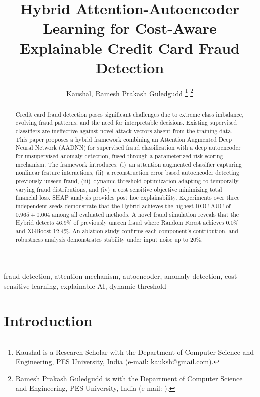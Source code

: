 \documentclass[conference]{IEEEtran}
\begin{document}
\title{Hybrid Attention-Autoencoder Learning for Cost-Aware Explainable Credit Card Fraud Detection}

\author{
Kaushal,
Ramesh Prakash Guledgudd
%
\thanks{Kaushal is a Research Scholar with the Department of Computer Science and Engineering, PES University, India (e-mail: kauksh@gmail.com).}
\thanks{Ramesh Prakash Guledgudd is with the Department of Computer Science and Engineering, PES University, India (e-mail: ).}
}

\maketitle

\begin{abstract}
Credit card fraud detection poses significant challenges due to extreme class imbalance, evolving fraud patterns, and the need for interpretable decisions. Existing supervised classifiers are ineffective against novel attack vectors absent from the training data. This paper proposes a hybrid framework combining an Attention Augmented Deep Neural Network (AADNN) for supervised fraud classification with a deep autoencoder for unsupervised anomaly detection, fused through a parameterized risk scoring mechanism. The framework introduces: (i)~an attention augmented classifier capturing nonlinear feature interactions, (ii)~a reconstruction error based autoencoder detecting previously unseen fraud, (iii)~dynamic threshold optimization adapting to temporally varying fraud distributions, and (iv)~a cost sensitive objective minimizing total financial loss. SHAP analysis provides post hoc explainability. Experiments over three independent seeds demonstrate that the Hybrid achieves the highest ROC AUC of $0.965 \pm 0.004$ among all evaluated methods. A novel fraud simulation reveals that the Hybrid detects 46.9\% of previously unseen fraud where Random Forest achieves 0.0\% and XGBoost 12.4\%. An ablation study confirms each component's contribution, and robustness analysis demonstrates stability under input noise up to 20\%.
\end{abstract}

\begin{IEEEkeywords}
fraud detection, attention mechanism, autoencoder, anomaly detection, cost sensitive learning, explainable AI, dynamic threshold
\end{IEEEkeywords}

\section{Introduction}
\label{sec:intro}
\end{document}
